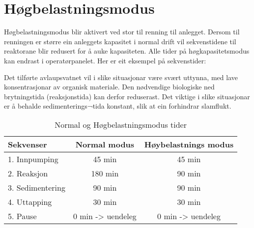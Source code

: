 \newpage
\section{Høgbelastningsmodus}

Høgbelastningsmodus blir aktivert ved stor til renning til anlegget. 
Dersom til renningen er større ein anleggets kapasitet i normal drift vil sekvenstidene til reaktorane blir redusert for å auke kapasiteten. 
Alle tider på høgkapasitetsmodus kan endrast i operatørpanelet.
Her er eit eksempel på sekvenstider:

Det tilførte avlaupsvatnet vil i slike situasjonar være svært uttynna, med lave konsentrasjonar av organisk materiale.
Den nødvendige biologiske ned brytningstida (reaksjonstida) kan derfor reduserast. 
Det viktige i slike situasjonar er å behalde sedimenterings¬tida konstant, slik at ein forhindrar slamflukt.

\begin{table}[h]
    \centering
    \begin{tabular}{|l|c|c|}
    \hline
        \rowcolor{myblack} %
        \textcolor{purewhite}{Sekvenser} & \textcolor{purewhite}{Normal modus} & \textcolor{purewhite}{Høybelastnings modus} \\ \hline
        \rowcolor{lightgray} 1. Innpumping & 45 min & 45 min \\ \hline
        \rowcolor{purewhite} 2. Reaksjon & 180 min & 90 min \\ \hline 
        \rowcolor{lightgray} 3. Sedimentering & 90 min & 90 min \\ \hline
        \rowcolor{purewhite} 4. Uttapping & 30 min & 30 min \\ \hline
        \rowcolor{lightgray} 5. Pause & 0 min -> uendeleg & 0 min -> uendeleg  \\ \hline
    \end{tabular}
    \caption{Normal og Høgbelastningsmodus tider}\label{table:Normal Og Høgbelastningsmodus}
\end{table}



